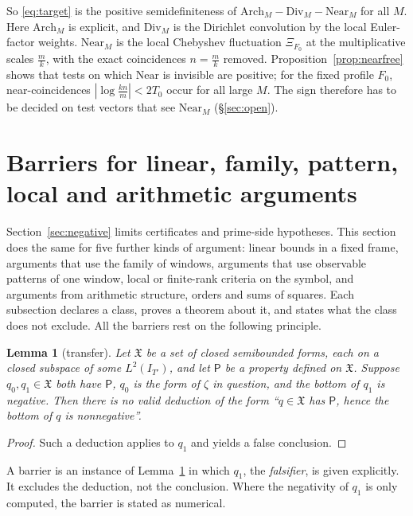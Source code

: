 \documentclass[11pt]{amsart}
\newtheorem{lemma}[theorem]{Lemma}
\theoremstyle{definition}
\theoremstyle{remark}
\begin{document}
So \eqref{eq:target} is the positive semidefiniteness of $\mathrm{Arch}_M-\mathrm{Div}_M-\mathrm{Near}_M$ for all $M$. Here
$\mathrm{Arch}_M$ is explicit, and $\mathrm{Div}_M$ is the Dirichlet convolution by the local Euler-factor weights. $\mathrm{Near}_M$
is the local Chebyshev fluctuation $\Xi_{F_0}$ at the multiplicative scales $\frac mk$, with the exact coincidences $n=\frac mk$
removed. Proposition~\ref{prop:nearfree} shows that tests on which $\mathrm{Near}$ is invisible are positive; for the fixed profile
$F_0$, near-coincidences $|\log\frac{kn}m|<2T_0$ occur for all large $M$. The sign therefore has to be decided on test vectors that
see $\mathrm{Near}_M$ (\S\ref{sec:open}).


\section{Barriers for linear, family, pattern, local and arithmetic arguments}\label{sec:barriers}

Section~\ref{sec:negative} limits certificates and prime-side hypotheses. This section does the same for five
further kinds of argument: linear bounds in a fixed frame, arguments that use the family of windows,
arguments that use observable patterns of one window, local or finite-rank criteria on the symbol, and arguments
from arithmetic structure, orders and sums of squares.
Each subsection declares a class, proves a theorem about it, and states what the class does not exclude.
All the barriers rest on the following principle.

\begin{lemma}[transfer]\label{lem:transfer}
Let $\mathfrak X$ be a set of closed semibounded forms, each on a closed subspace of some $L^2(I_{T'})$, and let
$\mathsf P$ be a property defined on $\mathfrak X$. Suppose $q_0,q_1\in\mathfrak X$ both have $\mathsf P$, $q_0$ is the
form of $\zeta$ in question, and the bottom of $q_1$ is negative. Then there is no valid deduction of the form
``$q\in\mathfrak X$ has $\mathsf P$, hence the bottom of $q$ is nonnegative''.
\end{lemma}
\begin{proof}
Such a deduction applies to $q_1$ and yields a false conclusion.
\end{proof}

A barrier is an instance of Lemma~\ref{lem:transfer} in which $q_1$, the \emph{falsifier}, is given explicitly. It
excludes the deduction, not the conclusion. Where the negativity of $q_1$ is only computed, the barrier is stated
as numerical.
\end{document}

